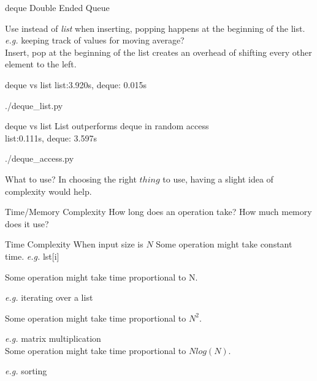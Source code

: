 \documentclass{beamer}
\begin{document}
\begin{frame}{deque}
  Double Ended Queue

  Use instead of \textit{list} when inserting, popping happens at the beginning
  of the list. \textit{e.g.} keeping track of values for moving average?\\
  Insert, pop at the beginning of the list creates an overhead of
  shifting every other element to the left.\\
\end{frame}

\begin{frame}{deque vs list}
  list:3.920s, deque: 0.015s
  \begin{lstinputlisting}
    {./deque_list.py}
  \end{lstinputlisting}
\end{frame}


\begin{frame}{deque vs list}
  List outperforms deque in random access\\
  list:0.111s, deque: 3.597s
  \begin{lstinputlisting}
    {./deque_access.py}
  \end{lstinputlisting}
\end{frame}

\begin{frame}{What to use?}
  In choosing the right $thing$ to use, having a slight idea of complexity
  would help.
\end{frame}

\begin{frame}{Time/Memory Complexity}
  How long does an operation take? How much memory does it use?\\
\end{frame}

\begin{frame}{Time Complexity}
  When input size is $N$
  Some operation might take constant time. \textit{e.g.} lst[i]

  Some operation might take time proportional to N.

  \textit{e.g.} iterating over a list

  Some operation might take time proportional to $N^{2}$.

  \textit{e.g.} matrix multiplication\\

  Some operation might take time proportional to $Nlog(N)$.

  \textit{e.g.} sorting
\end{frame}
\end{document}
